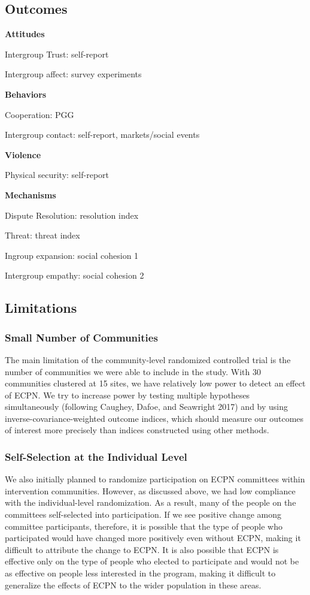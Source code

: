 \documentclass[11pt]{article}
\begin{document}
\subsection{Outcomes}\label{outcomes}

\textbf{Attitudes}

Intergroup Trust: self-report

Intergroup affect: survey experiments

\textbf{Behaviors}

Cooperation: PGG

Intergroup contact: self-report, markets/social events

\textbf{Violence}

Physical security: self-report

\textbf{Mechanisms}

Dispute Resolution: resolution index

Threat: threat index

Ingroup expansion: social cohesion 1

Intergroup empathy: social cohesion 2

\subsection{Limitations}\label{limitations}

\subsubsection{Small Number of
Communities}\label{small-number-of-communities}

The main limitation of the community-level randomized controlled trial
is the number of communities we were able to include in the study. With
30 communities clustered at 15 sites, we have relatively low power to
detect an effect of ECPN. We try to increase power by testing multiple
hypotheses simultaneously (following Caughey, Dafoe, and Seawright 2017)
and by using inverse-covariance-weighted outcome indices, which should
measure our outcomes of interest more precisely than indices constructed
using other methods.

\subsubsection{Self-Selection at the Individual
Level}\label{self-selection-at-the-individual-level}

We also initially planned to randomize participation on ECPN committees
within intervention communities. However, as discussed above, we had low
compliance with the individual-level randomization. As a result, many of
the people on the committees self-selected into participation. If we see
positive change among committee participants, therefore, it is possible
that the type of people who participated would have changed more
positively even without ECPN, making it difficult to attribute the
change to ECPN. It is also possible that ECPN is effective only on the
type of people who elected to participate and would not be as effective
on people less interested in the program, making it difficult to
generalize the effects of ECPN to the wider population in these areas.
\end{document}
